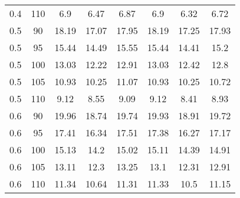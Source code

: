 \documentclass{article}
\begin{document}
\begin{table}[H]
\begin{tabular}{|c|c|c|c|c|c|c|c|}
  0.4 & 110 & 6.9 & 6.47 & 6.87 & 6.9 & 6.32 & 6.72 \\
  0.5 & 90 & 18.19 & 17.07 & 17.95 & 18.19 & 17.25 & 17.93 \\
  0.5 & 95 & 15.44 & 14.49 & 15.55 & 15.44 & 14.41 & 15.2 \\
  0.5 & 100 & 13.03 & 12.22 & 12.91 & 13.03 & 12.42 & 12.8 \\
  0.5 & 105 & 10.93 & 10.25 & 11.07 & 10.93 & 10.25 & 10.72 \\
  0.5 & 110 & 9.12 & 8.55 & 9.09 & 9.12 & 8.41 & 8.93 \\
  0.6 & 90 & 19.96 & 18.74 & 19.74 & 19.93 & 18.91 & 19.72 \\
  0.6 & 95 & 17.41 & 16.34 & 17.51 & 17.38 & 16.27 & 17.17 \\
  0.6 & 100 & 15.13 & 14.2 & 15.02 & 15.11 & 14.39 & 14.91 \\
  0.6 & 105 & 13.11 & 12.3 & 13.25 & 13.1 & 12.31 & 12.91 \\
  0.6 & 110 & 11.34 & 10.64 & 11.31 & 11.33 & 10.5 & 11.15 \\
  \hline
  \end{tabular}
\end{table}
\end{document}
